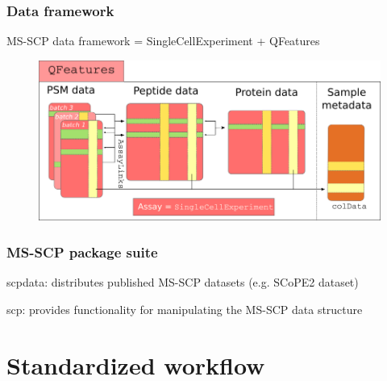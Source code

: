 \documentclass{beamer}
\newcommand{\frametitlesection}[1]{\frametitle{\centering #1 \footnotesize \hspace{0pt plus 1 filll} \insertsection}}
\begin{document}
\begin{frame}
    \frametitlesection{Data framework}

    MS-SCP data framework = SingleCellExperiment + QFeatures
    \begin{figure}
        \centering
        \includegraphics[width=.9\linewidth]{figs/SCP_framework.png}
    \end{figure}

    
\end{frame}

\begin{frame}
    \frametitlesection{MS-SCP package suite}
    
    scpdata: distributes published MS-SCP datasets (e.g. SCoPE2 dataset)
    
    scp: provides functionality for manipulating the MS-SCP data structure

\end{frame}


\section{Standardized workflow}
\end{document}
